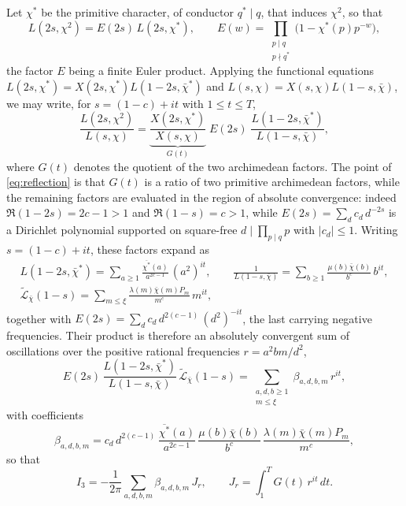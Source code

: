 \documentclass[10pt,a4paper]{amsart}
\numberwithin{equation}{section}
\begin{document}
Let $\chi^*$ be the primitive character, of conductor $q^*\mid q$, that induces $\chi^2$, so that
\[
L(2s,\chi^2)=E(2s)\,L(2s,\chi^*),
\qquad
E(w)=\prod_{\substack{p\mid q\\ p\nmid q^*}}\bigl(1-\chi^*(p)p^{-w}\bigr),
\]
the factor $E$ being a finite Euler product. Applying the functional equations $L(2s,\chi^*)=X(2s,\chi^*)L(1-2s,\bar\chi^*)$ and $L(s,\chi)=X(s,\chi)L(1-s,\bar\chi)$, we may write, for $s=(1-c)+it$ with $1\le t\le T$,
\begin{equation}\label{eq:reflection}
\frac{L(2s,\chi^2)}{L(s,\chi)}=\underbrace{\frac{X(2s,\chi^*)}{X(s,\chi)}}_{G(t)}\;E(2s)\;\frac{L(1-2s,\bar\chi^*)}{L(1-s,\bar\chi)},
\end{equation}
where $G(t)$ denotes the quotient of the two archimedean factors. The point of \eqref{eq:reflection} is that $G(t)$ is a ratio of two primitive archimedean factors, while the remaining factors are evaluated in the region of absolute convergence: indeed $\Re(1-2s)=2c-1>1$ and $\Re(1-s)=c>1$, while $E(2s)=\sum_d c_d\,d^{-2s}$ is a Dirichlet polynomial supported on square-free $d\mid\prod_{p\mid q}p$ with $|c_d|\le1$. Writing $s=(1-c)+it$, these factors expand as
\[
\begin{gathered}
L(1-2s,\bar\chi^*)=\sum_{a\ge1}\frac{\overline{\chi^*}(a)}{a^{2c-1}}\,(a^2)^{it},\qquad
\frac{1}{L(1-s,\bar\chi)}=\sum_{b\ge1}\frac{\mu(b)\bar\chi(b)}{b^{c}}\,b^{it},\\
\widetilde{\mathcal{L}}_{\bar\chi}(1-s)=\sum_{m\le\xi}\frac{\lambda(m)\bar\chi(m)P_m}{m^{c}}\,m^{it},
\end{gathered}
\]
together with $E(2s)=\sum_d c_d\,d^{2(c-1)}\,(d^{2})^{-it}$, the last carrying negative frequencies. Their product is therefore an absolutely convergent sum of oscillations over the positive rational frequencies $r=a^2bm/d^2$,
\[
E(2s)\,\frac{L(1-2s,\bar\chi^*)}{L(1-s,\bar\chi)}\,\widetilde{\mathcal{L}}_{\bar\chi}(1-s)
=\sum_{\substack{a,d,b\ge1\\ m\le\xi}}\beta_{a,d,b,m}\,r^{it},
\]
with coefficients
\[
\beta_{a,d,b,m}=c_d\,d^{2(c-1)}\,\frac{\overline{\chi^*}(a)}{a^{2c-1}}\,\frac{\mu(b)\bar\chi(b)}{b^{c}}\,\frac{\lambda(m)\bar\chi(m)P_m}{m^{c}},
\]
so that
\[
I_3=-\frac{1}{2\pi}\sum_{a,d,b,m}\beta_{a,d,b,m}\,J_r,
\qquad
J_r=\int_1^T G(t)\,r^{it}\,dt .
\]
\end{document}
